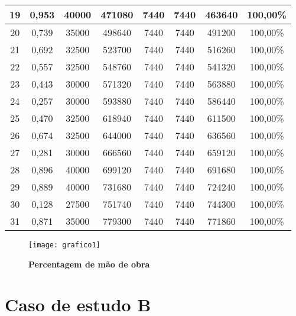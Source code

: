 \documentclass[11pt,a4paper]{report}
\begin{document}
\begin{table} [h]
\begin{center}
\begin{adjustbox}{max width=0.9\textwidth,max totalheight=\textheight,keepaspectratio}
\begin{tabular} {|c|c|c|c|c|c|c|c|}
\hline 
19 &	0,953 &	40000 &	471080 &	7440 &	7440 &	463640 &	100,00\%\\ 
\hline 
20 &	0,739 &	35000 &	498640 &	7440 &	7440 &	491200 &	100,00\%\\ 
\hline 
21 &	0,692 &	32500 &	523700 &	7440 &	7440 &	516260 &	100,00\%\\ 
\hline 
22 &	0,557 &	32500 &	548760 &	7440 &	7440 &	541320 &	100,00\%\\ 
\hline 
23 &	0,443 &	30000 &	571320 &	7440 &	7440 &	563880 &	100,00\%\\ 
\hline 
24 &	0,257 &	30000 &	593880 &	7440 &	7440 &	586440 &	100,00\%\\ 
\hline 
25 &	0,470 &	32500 &	618940 &	7440 &	7440 &	611500 &	100,00\%\\ 
\hline 
26 &	0,674 &	32500 &	644000 &	7440 &	7440 &	636560 &	100,00\%\\ 
\hline 
27 &	0,281 &	30000 &	666560 &	7440 &	7440 &	659120 &	100,00\%\\ 
\hline 
28 &	0,896 &	40000 &	699120 &	7440 &	7440 &	691680 &	100,00\%\\ 
\hline 
29 &	0,889 &	40000 &	731680 &	7440 &	7440 &	724240 &	100,00\%\\ 
\hline 
30 &	0,128 &	27500 &	751740 &	7440 &	7440 &	744300 &	100,00\%\\ 
\hline 
31 &	0,871 &	35000 &	779300 &	7440&	7440 &	771860 &	100,00\%\\ 
\hline 
\end{tabular}
\end{adjustbox}
\end{center}
\end{table}
\begin{figure} [h]
\begin{center}
\caption{\bf Percentagem de mão de obra}
\texttt{[image: grafico1]}
\end{center}
\label{figura1}
\end{figure}

\section{Caso de estudo B}
\end{document}
